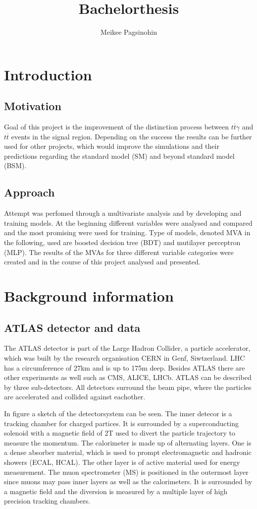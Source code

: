 \documentclass[11pt]{scrartcl}
\title{Bachelorthesis}
\author{Meikee Pagsinohin}
\begin{document}
\section{Introduction}

	\subsection{Motivation}
		Goal of this project is the improvement of the distinction process between $t\overline{t}\gamma$ and $t\overline{t}$ events in the signal region. Depending on the success the results can be further used for other projects, which would improve the simulations and their predictions regarding the standard model (SM) and beyond standard model (BSM). 

	\subsection{Approach}
		Attempt was perfomed through a multivariate analysis and by developing and training models. At the beginning different variables were analysed and compared and the most promising were used for training. Type of models, denoted MVA in the following, used are boosted decision tree (BDT) and mutilayer perceptron (MLP). The results of the MVAs for three different variable categories were created and in the course of this project analysed and presented.

\section{Background information}
	\subsection{ATLAS detector and data}
	The ATLAS detector is part of the Large Hadron Collider, a particle accelerator, which was built by the research organisation CERN in Genf, Siwtzerland. LHC has a circumference of 27km and is up to 175m deep. Besides ATLAS there are other experiments as well such as CMS, ALICE, LHCb. ATLAS can be described by three sub-detectors. All detectors surround the beam pipe, where the particles are accelerated and collided against eachother.
	
	In figure a sketch of the detectorsystem can be seen. The inner detecor is a tracking chamber for charged partices. It is surrounded by a superconducting solenoid with a magnetic field of 2T used to divert the particle trajectory to measure the momentum. The calorimeter is made up of alternating layers. One is a dense absorber material, which is used to prompt electromagnetic and hadronic showers (ECAL, HCAL). The other layer is of active material used for energy measurement. The muon spectrometer (MS) is positioned in the outermost layer since muons may pass inner layers as well as the calorimeters. It is surrounded by a magnetic field and the diversion is measured by a multiple layer of high precision tracking chambers. 
	
\end{document}
